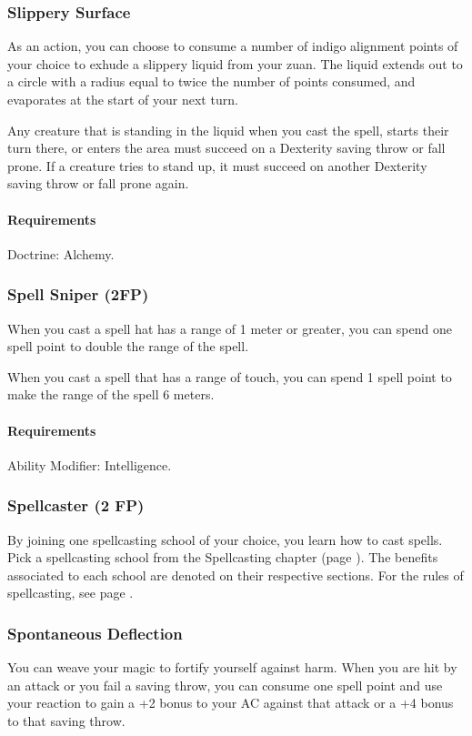 \subsubsection{Slippery Surface} \label{feat::slipperysurface}
    As an action, you can choose to consume a number of indigo alignment points of your choice to exhude a slippery liquid from your zuan.
    The liquid extends out to a circle with a radius equal to twice the number of points consumed, and evaporates at the start of your next turn.

    Any creature that is standing in the liquid when you cast the spell, starts their turn there, or enters the area must succeed on a Dexterity saving throw or fall prone.
    If a creature tries to stand up, it must succeed on another Dexterity saving throw or fall prone again.
    \paragraph{Requirements} Doctrine: Alchemy.
\subsubsection{Spell Sniper (2FP)} \label{feat::spellsniper}
    When you cast a spell hat has a range of 1 meter or greater, you can spend one spell point to double the range of the spell.

    When you cast a spell that has a range of touch, you can spend 1 spell point to make the range of the spell 6 meters.
    \paragraph{Requirements} Ability Modifier: Intelligence.
\subsubsection{Spellcaster (2 FP)} \label{feat::spellcaster}
    By joining one spellcasting school of your choice, you learn how to cast spells.
    Pick a spellcasting school from the Spellcasting chapter (page \pageref{ch::spellcasting}).
    The benefits associated to each school are denoted on their respective sections.
    For the rules of spellcasting, see page \pageref{sec::spellcastingrules}.
\subsubsection{Spontaneous Deflection} \label{feat::spontaneousdeflection}
    You can weave your magic to fortify yourself against harm.
    When you are hit by an attack or you fail a saving throw, you can consume one spell point and use your reaction to gain a +2 bonus to your AC against that attack or a +4 bonus to that saving throw.
